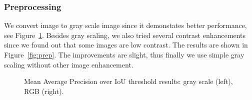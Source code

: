\documentclass[runningheads]{llncs}
\begin{document}
\subsubsection{Preprocessing} We convert image to gray scale image since it demonstates better performance, see Figure~\ref{fig:gray}. Besides gray scaling, we also tried several contrast enhancements since we found out that some images are low contrast. The results are shown in Figure~\ref{fig:prep}. The improvements are slight, thus finally we use simple gray scaling without other image enhancement.
\begin{figure}[ht]
	\centering
	\setlength{\fboxrule}{0.0pt}
	\caption{Mean Average Precision over IoU threshold results: gray scale (left), RGB (right).}
	\label{fig:gray}
\end{figure}
\end{document}
